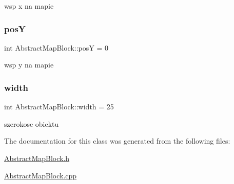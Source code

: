 wsp x na mapie \mbox{\label{class_abstract_map_block_a5e286fbe867af6c78c17e7e21f9948c4}} 
\subsubsection{\texorpdfstring{posY}{posY}}
{\footnotesize\ttfamily int Abstract\+Map\+Block\+::posY = 0}

wsp y na mapie \mbox{\label{class_abstract_map_block_afdfb3d8630fb089667c05daa27598ebb}} 
\subsubsection{\texorpdfstring{width}{width}}
{\footnotesize\ttfamily int Abstract\+Map\+Block\+::width = 25}

szerokosc obiektu 

The documentation for this class was generated from the following files\+:\begin{DoxyCompactItemize}
\item 
\hyperlink{_abstract_map_block_8h}{Abstract\+Map\+Block.\+h}\item 
\hyperlink{_abstract_map_block_8cpp}{Abstract\+Map\+Block.\+cpp}\end{DoxyCompactItemize}
